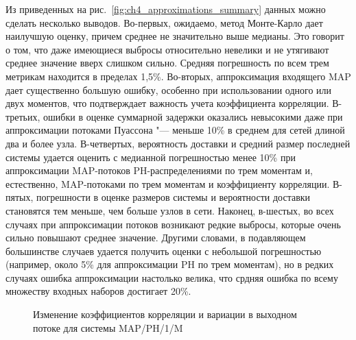 Из приведенных на рис.~\ref{fig:ch4_approximations_summary} данных можно сделать несколько выводов. Во-первых, ожидаемо, метод Монте-Карло дает наилучшую оценку, причем среднее не значительно выше медианы. Это говорит о том, что даже имеющиеся выбросы относительно невелики и не утягивают среднее значение вверх слишком сильно. Средняя погрешность по всем трем метрикам находится в пределах 1,5\%. Во-вторых, аппроксимация входящего MAP дает существенно большую ошибку, особенно при использовании одного или двух моментов, что подтверждает важность учета коэффициента корреляции. В-третьих, ошибки в оценке суммарной задержки оказались невысокими даже при аппроксимации потоками Пуассона "--- меньше 10\% в среднем для сетей длиной два и более узла. В-четвертых, вероятность доставки и средний размер последней системы удается оценить с медианной погрешностью менее 10\% при аппроксимации MAP-потоков PH-распределениями по трем моментам и, естественно, MAP-потоками по трем моментам и коэффициенту корреляции. В-пятых, погрешности в оценке размеров системы и вероятности доставки становятся тем меньше, чем больше узлов в сети. Наконец, в-шестых, во всех случаях при аппроксимации потоков возникают редкие выбросы, которые очень сильно повышают среднее значение. Другими словами, в подавляющем большинстве случаев удается получить оценки с небольшой погрешностью (например, около 5\% для аппроксимации PH по трем моментам), но в редких случаях ошибка аппроксимации настолько велика, что срдняя ошибка по всему множеству входных наборов достигает 20\%.

\begin{figure}[h]
  \caption{Изменение коэффициентов корреляции и вариации в выходном потоке для системы MAP/PH/1/M}
  \label{fig:ch4_departure_autocorr}
\end{figure}

